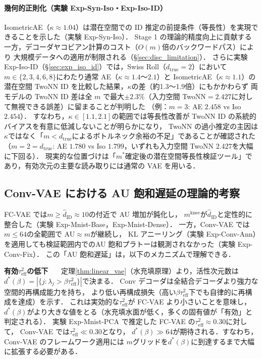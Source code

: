 \documentclass[11pt,a4paper]{jsarticle}
\newcommand{\dzopt}{m^*}
\newcommand{\kap}{\kappa}
\newcommand{\mknee}{m^{\mathrm{knee}}}
\begin{document}
\paragraph{幾何的正則化（実験 Exp-Syn-Iso・Exp-Iso-ID）}
IsometricAE（$\kap \approx 1.04$）は潜在空間での ID 推定の前提条件（等長性）を実現できることを示した（実験 Exp-Syn-Iso）．
Stage 1 の理論的精度向上に貢献する一方，デコーダヤコビアン計算のコスト（$O(m)$倍のバックワードパス）により
大規模データへの適用が制限される（§\ref{sec:disc_limitation}）．
さらに実験 Exp-Iso-ID（§\ref{sec:exp_iso_id}）では，Swiss Roll（$d_\mathrm{true}=2$）において
$m \in \{2,3,4,6,8\}$にわたり通常 AE（$\kap \approx 1.4$〜$2.1$）と IsometricAE（$\kap \approx 1.1$）の
潜在空間 TwoNN ID を比較した結果，$\kap$の差（約1.3〜1.9倍）にもかかわらず
両モデルの TwoNN ID 差は全 $m$ で最大$\pm2.3\%$（入力空間 TwoNN$=2.427$に対して無視できる誤差）に留まることが判明した
（例：$m=3$: AE $2.458$ vs Iso $2.454$）．
すなわち，$\kap \in [1.1, 2.1]$の範囲では等長性改善が TwoNN ID の系統的バイアスを有意に低減しないことが明らかになり，
TwoNN の過小推定の主因は$\kap$ではなく「$m < d_\mathrm{true}$によるボトルネック余裕の不足」であることが確認された
（$m=2=d_\mathrm{true}$: AE $1.780$ vs Iso $1.799$，いずれも入力空間 TwoNN $2.427$を大幅に下回る）．
現実的な位置づけは「$\dzopt$確定後の潜在空間等長性検証ツール」であり，有効次元の主要な読み取りには通常の VAE を用いる．

\subsection{Conv-VAE における AU 飽和遅延の理論的考察}\label{sec:disc_convvae}

FC-VAE では$m \geq \hat{d}_\mathrm{ID} \approx 10$の付近で AU 増加が鈍化し，
$\mknee$が$\hat{d}_\mathrm{ID}$と定性的に整合した（実験 Exp-Mnist-Base，Exp-Mnist-Dense）．
一方，Conv-VAE では$m \leq 64$の全範囲で AU$\approx m$が継続し，
KL アニーリング（実験 Exp-Conv-Ann）を適用しても検証範囲内でのAU 飽和プラトーは観測されなかった（実験 Exp-Conv-Fix）．
この「AU 飽和遅延」は，以下のメカニズムで理解できる．

\textbf{有効$\tau^2_\mathrm{eff}$の低下}~~~
定理\ref{thm:linear_vae}（水充填原理）より，活性次元数は
$d^*(\beta) = |\{j : \lambda_j > \beta\tau^2_\mathrm{eff}\}|$で決まる．
Conv デコーダは全結合デコーダより強力な空間的再構成能力を持ち，
より低い再構成損失（高い$\beta\tau^2_\mathrm{eff}$下でも自律的に再構成を達成）を示す．
これは実効的な$\tau^2_\mathrm{eff}$が FC-VAE より小さいことを意味し，
$d^*(\beta)$がより大きな値をとる（水充填水面が低く，多くの固有値が「有効」と判定される）．
実験 Exp-Mnist-PCA で推定した FC-VAE の$\tau^2_\mathrm{eff} \approx 0.30$に対して，
Conv-VAE では$\tau^2_\mathrm{eff} \ll 0.30$となり，
$d^*(\beta) \gg 64$が期待される．すなわち，Conv-VAE のフレームワーク適用には
$m$グリッドを$d^*(\beta)$に到達するまで大幅に拡張する必要がある．
\end{document}
